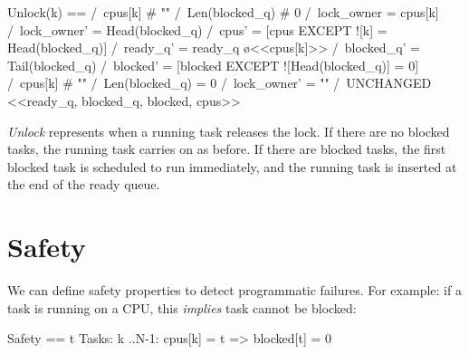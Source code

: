 \begin{tla}
Unlock(k) == 
    \/  /\ cpus[k] # "" 
        /\ Len(blocked_q) # 0
        /\ lock_owner = cpus[k]
        /\ lock_owner' = Head(blocked_q)
        /\ cpus' = [cpus EXCEPT ![k] = Head(blocked_q)]
        /\ ready_q' = ready_q \o <<cpus[k]>>
        /\ blocked_q' = Tail(blocked_q)
        /\ blocked' = [blocked EXCEPT ![Head(blocked_q)] = 0]
    \/  /\ cpus[k] # "" 
        /\ Len(blocked_q) = 0
        /\ lock_owner' = ""
        /\ UNCHANGED <<ready_q, blocked_q, blocked, cpus>>
\end{tla}
\begin{tlatex}
%
%
%
%
%
%
%
%
%
\end{tlatex}
\newline

\textit{Unlock} represents when a running task releases the lock. If there are
no blocked tasks, the running task carries on as before. If there are blocked
tasks, the first blocked task is scheduled to run immediately, and the running task
is inserted at the end of the ready queue. 

\section{Safety}

We can define safety properties to detect programmatic failures. For example: if a
task is running on a CPU, this \textit{implies} task cannot be blocked:\newline

\begin{tla}
Safety ==
    \A t \in Tasks: 
        \A k ..N-1:
            cpus[k] = t => blocked[t] = 0 
\end{tla}
\begin{tlatex}
%
%
%
%
\end{tlatex}

